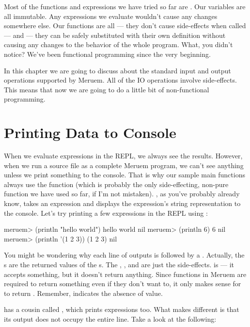 Most of the functions and expressions we have tried so far are . Our variables are all immutable. Any expressions we evaluate wouldn't cause any changes somewhere else. Our functions are all  --- they don't cause side-effects when called --- and  --- they can be safely substituted with their own definition without causing any changes to the behavior of the whole program. What, you didn't notice? We've been functional programming since the very beginning.

In this chapter we are going to discuss about the standard input and output operations supported by Meruem. All of the IO operations involve side-effects. This means that now we are going to do a little bit of non-functional programming.

\section{Printing Data to Console}
When we evaluate expressions in the REPL, we always see the results. However, when we run a source file as a complete Meruem program, we can't see anything unless we print something to the console. That is why our sample main functions always use the  function (which is probably the only side-effecting, non-pure function we have used so far, if I'm not mistaken). , as you've probably already know, takes an expression and displays the expression's string representation to the console. Let's try printing a few expressions in the REPL using :

\begin{REPL}
meruem> (println "hello world")
hello world
nil
meruem> (println 6)
6
nil
meruem> (println '(1 2 3))
(1 2 3)
nil
\end{REPL}

You might be wondering why each line of outputs is followed by a . Actually, the s are the returned values of the s. The , , and  are just the side-effects.  is  --- it accepts something, but it doesn't return anything. Since functions in Meruem are required to return something even if they don't want to, it only makes sense for  to return . Remember,  indicates the absence of value.

 has a cousin called , which prints expressions too. What makes  different is that its output does not occupy the entire line. Take a look at the following:

